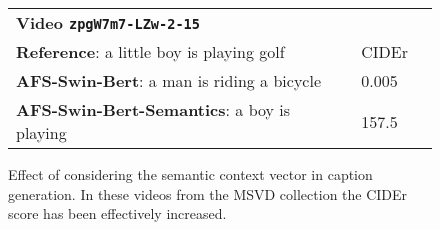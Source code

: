 \documentclass[runningheads,table]{llncs}
\begin{document}
\begin{figure*}
       
        \small{
        \begin{tabular}{lll}
        \textbf{Video \texttt{zpgW7m7-LZw-2-15}}\\
        \textbf{Reference}: a little boy is playing golf & CIDEr \\
        \textbf{AFS-Swin-Bert}: a man is riding a bicycle & 0.005 \\
        \textbf{AFS-Swin-Bert-Semantics}: a boy is playing & 157.5 \\ 
        \end{tabular}
        }
      
    \caption{Effect of considering the semantic context vector in caption generation. In these videos from the MSVD collection the CIDEr score has been effectively increased.
}\label{fig:msvd-output}
\end{figure*}
\end{document}
